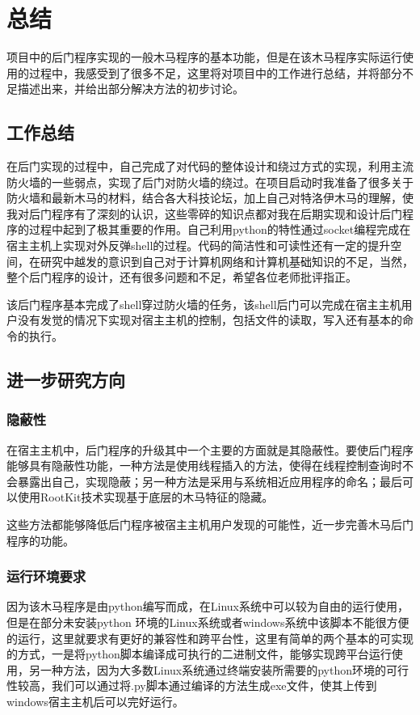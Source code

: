 \chapter{总结}
项目中的后门程序实现的一般木马程序的基本功能，但是在该木马程序实际运行使用的过程中，我感受到了很多不足，这里将对项目中的工作进行总结，并将部分不足描述出来，并给出部分解决方法的初步讨论。
\section{工作总结}
在后门实现的过程中，自己完成了对代码的整体设计和绕过方式的实现，利用主流防火墙的一些弱点，实现了后门对防火墙的绕过。在项目启动时我准备了很多关于防火墙和最新木马的材料，结合各大科技论坛，加上自己对特洛伊木马的理解，使我对后门程序有了深刻的认识，这些零碎的知识点都对我在后期实现和设计后门程序的过程中起到了极其重要的作用。自己利用python的特性通过socket编程完成在宿主主机上实现对外反弹shell的过程。代码的简洁性和可读性还有一定的提升空间，在研究中越发的意识到自己对于计算机网络和计算机基础知识的不足，当然，整个后门程序的设计，还有很多问题和不足，希望各位老师批评指正。

该后门程序基本完成了shell穿过防火墙的任务，该shell后门可以完成在宿主主机用户没有发觉的情况下实现对宿主主机的控制，包括文件的读取，写入还有基本的命令的执行。
\section{进一步研究方向}
\subsection{隐蔽性}
在宿主主机中，后门程序的升级其中一个主要的方面就是其隐蔽性。要使后门程序能够具有隐蔽性功能，一种方法是使用线程插入的方法，使得在线程控制查询时不会暴露出自己，实现隐蔽；另一种方法是采用与系统相近应用程序的命名；最后可以使用RootKit技术实现基于底层的木马特征的隐藏。

这些方法都能够降低后门程序被宿主主机用户发现的可能性，近一步完善木马后门程序的功能。

\subsection{运行环境要求}
因为该木马程序是由python编写而成，在Linux系统中可以较为自由的运行使用，但是在部分未安装python
环境的Linux系统或者windows系统中该脚本不能很方便的运行，这里就要求有更好的兼容性和跨平台性，这里有简单的两个基本的可实现的方式，一是将python脚本编译成可执行的二进制文件，能够实现跨平台运行使用，另一种方法，因为大多数Linux系统通过终端安装所需要的python环境的可行性较高，我们可以通过将.py脚本通过编译的方法生成exe文件，使其上传到windows宿主主机后可以完好运行。










